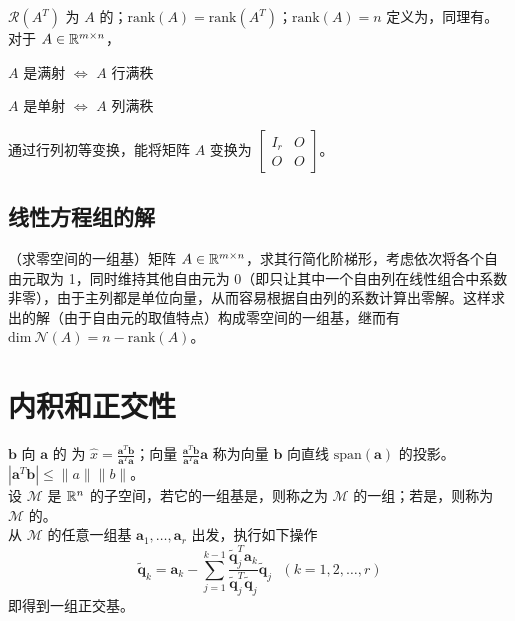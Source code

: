 \documentclass[./main.tex]{subfiles}
\begin{document}
$\mathcal{R}(A^T)$ 为 $A$ 的；$\mathrm{rank}(A)=\mathrm{rank}(A^T)$；$\mathrm{rank}(A)=n$ 定义为，同理有。\\

对于 $A\in\mathbb{R}^{m\times n}$，
\begin{itemize*}
    \item $A$ 是满射 $\iff$ $A$ 行满秩
    \item $A$ 是单射 $\iff$ $A$ 列满秩
\end{itemize*}

 通过行列初等变换，能将矩阵 $A$ 变换为 $\begin{bmatrix} I_r & O\\ O &O\end{bmatrix}$。

\subsection{线性方程组的解}
（求零空间的一组基）矩阵 $A\in\mathbb{R}^{m\times n}$，求其行简化阶梯形，考虑依次将各个自由元取为 1，同时维持其他自由元为 0（即只让其中一个自由列在线性组合中系数非零），由于主列都是单位向量，从而容易根据自由列的系数计算出零解。这样求出的解（由于自由元的取值特点）构成零空间的一组基，继而有 $\mathrm{dim}\ \mathcal{N}(A)=n-\mathrm{rank}(A)$。

\section{内积和正交性}

$\bm{b}$ 向 $\bm{a}$ 的 为 $\hat{x}=\frac{\bm{a}^T\bm{b}}{\bm{a}^T\bm{a}}$；向量 $\frac{\bm{a}^T\bm{b}}{\bm{a}^T\bm{a}}\bm{a}$ 称为向量 $\bm{b}$ 向直线 $\mathrm{span}(\bm{a})$ 的投影。\\

 $|\bm{a}^T\bm{b}|\le \|a\|\|b\|$。\\

设 $\mathcal{M}$ 是 $\mathbb{R}^{n}$ 的子空间，若它的一组基是，则称之为 $\mathcal{M}$ 的一组；若是，则称为 $\mathcal{M}$ 的。\\

从 $\mathcal{M}$ 的任意一组基 $\bm{a}_1,\dots,\bm{a}_r$ 出发，执行如下操作
\begin{equation}
    \bm{\widetilde{q}}_k=\bm{a}_k-\sum_{j=1}^{k-1}\frac{\bm{\widetilde{q}}_j^T\bm{a}_k}{\bm{\widetilde{q}}_j^T\bm{\widetilde{q}}_j}\bm{\widetilde{q}}_j \ \ \ (k=1,2,\dots,r)
\end{equation}
即得到一组正交基。
\end{document}
